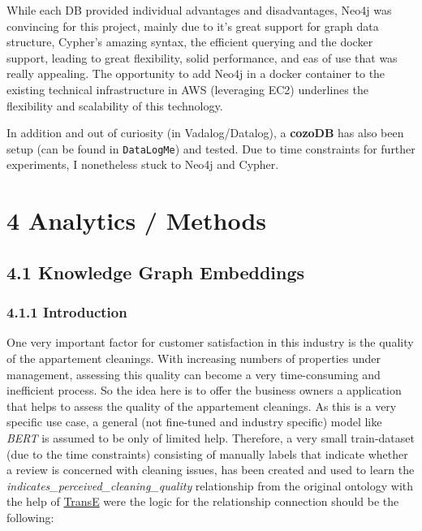 \documentclass[
]{article}
\begin{document}
While each DB provided individual advantages and disadvantages, Neo4j
was convincing for this project, mainly due to it's great support for
graph data structure, Cypher's amazing syntax, the efficient querying
and the docker support, leading to great flexibility, solid performance,
and eas of use that was really appealing. The opportunity to add Neo4j
in a docker container to the existing technical infrastructure in AWS
(leveraging EC2) underlines the flexibility and scalability of this
technology.

In addition and out of curiosity (in Vadalog/Datalog), a \textbf{cozoDB}
has also been setup (can be found in \texttt{DataLogMe}) and tested. Due
to time constraints for further experiments, I nonetheless stuck to
Neo4j and Cypher.

\pagebreak

\section{4 Analytics / Methods}\label{analytics-methods}

\subsection{4.1 Knowledge Graph
Embeddings}\label{knowledge-graph-embeddings}

\subsubsection{4.1.1 Introduction}\label{introduction-1}

One very important factor for customer satisfaction in this industry is
the quality of the appartement cleanings. With increasing numbers of
properties under management, assessing this quality can become a very
time-consuming and inefficient process. So the idea here is to offer the
business owners a application that helps to assess the quality of the
appartement cleanings. As this is a very specific use case, a general
(not fine-tuned and industry specific) model like \textit{BERT} is assumed to be
only of limited help. Therefore, a very small train-dataset (due to the
time constraints) consisting of manually labels that indicate whether a
review is concerned with cleaning issues, has been created and used to
learn the \emph{indicates\_perceived\_cleaning\_quality} relationship
from the original ontology with the help of
\href{https://proceedings.neurips.cc/paper_files/paper/2013/file/1cecc7a77928ca8133fa24680a88d2f9-Paper.pdf}{TransE}
were the logic for the relationship connection should be the following:
\end{document}
